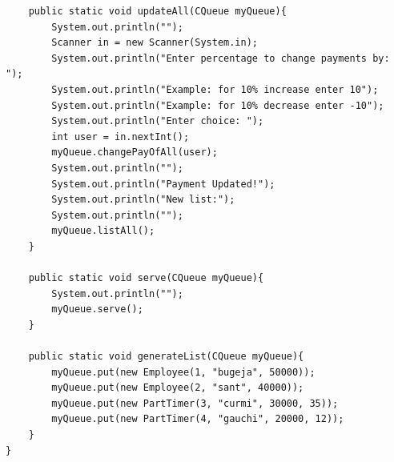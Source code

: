 \documentclass[12pt]{article}
\begin{document}
\begin{lstlisting}
    public static void updateAll(CQueue myQueue){  
        System.out.println("");
        Scanner in = new Scanner(System.in);   
        System.out.println("Enter percentage to change payments by: ");
        System.out.println("Example: for 10% increase enter 10");
        System.out.println("Example: for 10% decrease enter -10");
        System.out.println("Enter choice: ");
        int user = in.nextInt();
        myQueue.changePayOfAll(user);
        System.out.println("");
        System.out.println("Payment Updated!");
        System.out.println("New list:");
        System.out.println("");
        myQueue.listAll();
    }

    public static void serve(CQueue myQueue){
        System.out.println("");
        myQueue.serve();
    }

    public static void generateList(CQueue myQueue){
        myQueue.put(new Employee(1, "bugeja", 50000));
        myQueue.put(new Employee(2, "sant", 40000));
        myQueue.put(new PartTimer(3, "curmi", 30000, 35));
        myQueue.put(new PartTimer(4, "gauchi", 20000, 12));
    }
}


\end{lstlisting}


\end{document}
